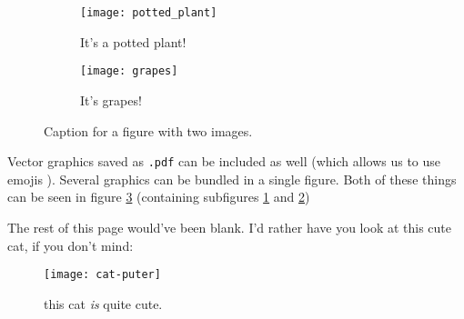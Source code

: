 \begin{figure}[H]
	\centering
	\begin{subfigure}{0.45\textwidth}
		\centering
		\texttt{[image: potted\_plant]} 
		\caption{It's a potted plant!}
		\label{fig:potted}
	\end{subfigure}
	\begin{subfigure}{0.45\textwidth}
		\centering
		\texttt{[image: grapes]} 
		\caption{It's grapes!}
		\label{fig:grapes}
	\end{subfigure}
	\caption{Caption for a figure with two images.}
	\label{fig:several}
\end{figure}
Vector graphics saved as \texttt{.pdf} can be included as well (which allows us to use emojis ).
Several graphics can be bundled in a single figure.
Both of these things can be seen in figure \ref{fig:several} (containing subfigures \ref{fig:potted} and \ref{fig:grapes})

\vfill
The rest of this page would've been blank.
I'd rather have you look at this cute cat, if you don't mind:
\begin{figure}[H]
	\centering
	\texttt{[image: cat-puter]}
	\caption{\small this cat \textit{is} quite cute.}
	\label{fig:cat}
\end{figure}
\vfill